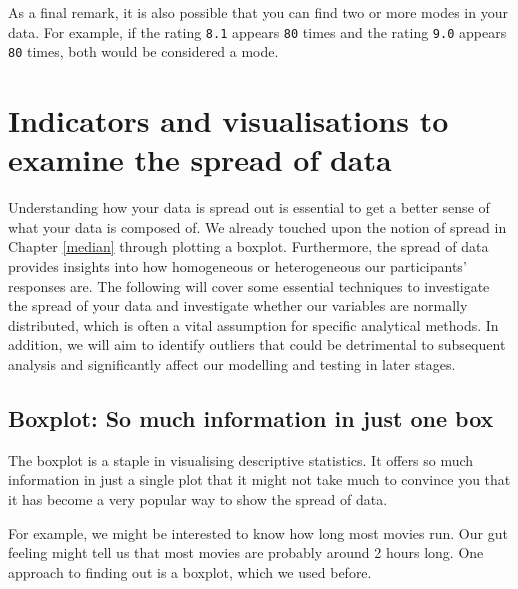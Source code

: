 \documentclass[
]{book}
\begin{document}
As a final remark, it is also possible that you can find two or more modes in your data. For example, if the rating \texttt{8.1} appears \texttt{80} times and the rating \texttt{9.0} appears \texttt{80} times, both would be considered a mode.

\hypertarget{spread-of-data}{%
\section{Indicators and visualisations to examine the spread of data}\label{spread-of-data}}

Understanding how your data is spread out is essential to get a better sense of what your data is composed of. We already touched upon the notion of spread in Chapter \ref{median} through plotting a boxplot. Furthermore, the spread of data provides insights into how homogeneous or heterogeneous our participants' responses are. The following will cover some essential techniques to investigate the spread of your data and investigate whether our variables are normally distributed, which is often a vital assumption for specific analytical methods. In addition, we will aim to identify outliers that could be detrimental to subsequent analysis and significantly affect our modelling and testing in later stages.

\hypertarget{boxplot-so-much-information-in-just-one-box}{%
\subsection{Boxplot: So much information in just one box}\label{boxplot-so-much-information-in-just-one-box}}

The boxplot is a staple in visualising descriptive statistics. It offers so much information in just a single plot that it might not take much to convince you that it has become a very popular way to show the spread of data.

For example, we might be interested to know how long most movies run. Our gut feeling might tell us that most movies are probably around 2 hours long. One approach to finding out is a boxplot, which we used before.
\end{document}
